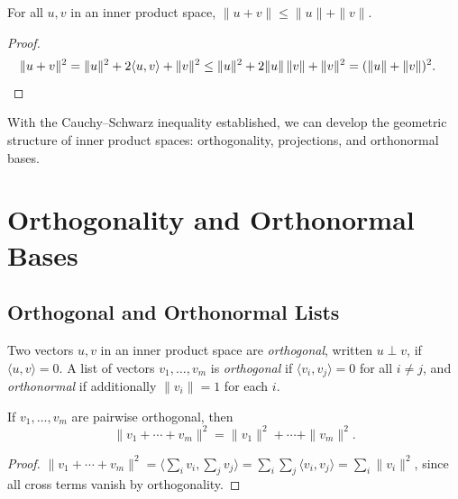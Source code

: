 \documentclass[11pt,a4paper]{article}
\begin{document}
\begin{corollary}
\label{cor:triangle}
For all $u, v$ in an inner product space, $\|u + v\| \leq \|u\| + \|v\|$.
\end{corollary}

\begin{proof}
\begin{align*}
  \|u + v\|^2
  &= \|u\|^2 + 2\langle u, v \rangle + \|v\|^2
   \leq \|u\|^2 + 2\|u\|\,\|v\| + \|v\|^2
   = (\|u\| + \|v\|)^2. \qedhere
\end{align*}
\end{proof}

With the Cauchy--Schwarz inequality established, we can develop the
geometric structure of inner product spaces: orthogonality, projections,
and orthonormal bases.

\section{Orthogonality and Orthonormal Bases}
\label{sec:orthogonality}

\subsection{Orthogonal and Orthonormal Lists}

\begin{definition}[Orthogonality]
\label{def:orthogonal}
Two vectors $u, v$ in an inner product space are \emph{orthogonal},
written $u \perp v$, if $\langle u, v \rangle = 0$.  A list of vectors
$v_1, \ldots, v_m$ is \emph{orthogonal} if $\langle v_i, v_j \rangle = 0$
for all $i \neq j$, and \emph{orthonormal} if additionally
$\|v_i\| = 1$ for each $i$.
\end{definition}

\begin{theorem}
\label{thm:pythagoras}
If $v_1, \ldots, v_m$ are pairwise orthogonal, then
\[
  \|v_1 + \cdots + v_m\|^2 = \|v_1\|^2 + \cdots + \|v_m\|^2.
\]
\end{theorem}

\begin{proof}
$\|v_1 + \cdots + v_m\|^2 = \langle \sum_i v_i, \sum_j v_j \rangle
= \sum_i \sum_j \langle v_i, v_j \rangle
= \sum_i \|v_i\|^2$,
since all cross terms vanish by orthogonality.
\end{proof}
\end{document}
